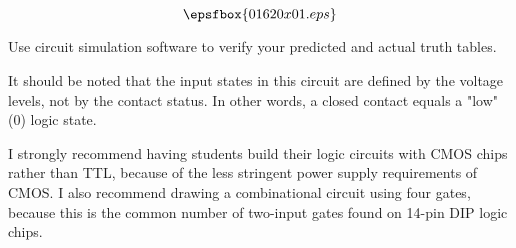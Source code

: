 

$$\epsfbox{01620x01.eps}$$

\vfil \eject






Use circuit simulation software to verify your predicted and actual truth tables.







It should be noted that the input states in this circuit are defined by the voltage levels, not by the contact status.  In other words, a closed contact equals a "low" (0) logic state.

I strongly recommend having students build their logic circuits with CMOS chips rather than TTL, because of the less stringent power supply requirements of CMOS.  I also recommend drawing a combinational circuit using four gates, because this is the common number of two-input gates found on 14-pin DIP logic chips.




